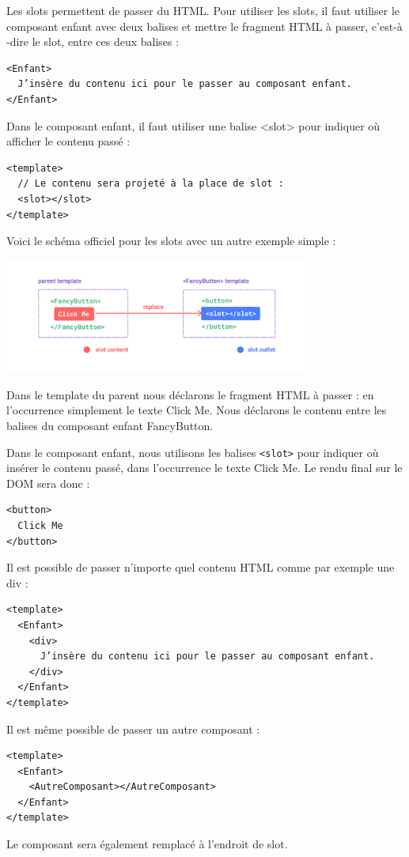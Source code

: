 Les {\color{monOrange}slots} permettent de passer du HTML. Pour utiliser les {\color{monOrange}slots}, il faut utiliser le composant enfant avec deux balises et mettre le fragment HTML à passer, c'est-à -dire le {\color{monOrange}slot}, entre ces deux balises :
\begin{verbatim}
<Enfant>
  J’insère du contenu ici pour le passer au composant enfant.
</Enfant>
\end{verbatim}
Dans le composant enfant, il faut utiliser une balise {\color{monOrange}<slot>} pour indiquer où afficher le contenu passé :
\begin{verbatim}
<template>
  // Le contenu sera projeté à la place de slot :
  <slot></slot>
</template>
\end{verbatim}
Voici le schéma officiel pour les {\color{monOrange}slots} avec un autre exemple simple :
\begin{center}
\includegraphics[width=10cm]{images/image10.png}
\end{center}

Dans le {\color{monOrange}template} du parent nous déclarons le fragment HTML à passer : en l'occurrence simplement le texte {\color{monOrange}Click Me}. Nous déclarons le contenu entre les balises du composant enfant {\color{monOrange}FancyButton}.

Dans le composant enfant, nous utilisons les balises {\tt <slot>} pour indiquer où insérer le contenu passé, dans l'occurrence le texte {\color{monOrange}Click Me}. Le rendu final sur le DOM sera donc :
\begin{verbatim}
<button>
  Click Me
</button>
\end{verbatim}
Il est possible de passer n'importe quel contenu HTML comme par exemple une {\color{monOrange}div} :
\begin{verbatim}
<template>
  <Enfant>
    <div>
      J’insère du contenu ici pour le passer au composant enfant.
    </div>
  </Enfant>
</template>
\end{verbatim}
Il est même possible de passer un autre composant :
\begin{verbatim}
<template>
  <Enfant>
    <AutreComposant></AutreComposant>
  </Enfant>
</template>
\end{verbatim}
Le composant sera également remplacé à l'endroit de {\color{monOrange}slot}.

